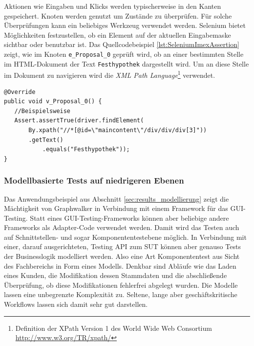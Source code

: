 Aktionen wie Eingaben und Klicks werden typischerweise in den Kanten gespeichert. Knoten werden genutzt um Zustände zu überprüfen. Für solche Überprüfungen kann ein beliebiges Werkzeug verwendet werden. 
Selenium bietet Möglichkeiten festzustellen, ob ein Element auf der aktuellen Eingabemaske sichtbar oder benutzbar ist. Das Quellcodebeispiel \ref{lst:SeleniumImexAssertion} zeigt, wie im Knoten \texttt{e\_Proposal\_0} geprüft wird, ob an einer bestimmten Stelle im HTML-Dokument der Text \texttt{Festhypothek} dargestellt wird. Um an diese Stelle im Dokument zu navigieren wird die \textit{XML Path Language}\footnote{Definition der XPath Version 1 des World Wide Web Consortium \url{http://www.w3.org/TR/xpath/}} verwendet.

\begin{lstlisting}[caption={Eine Assertion in Selenium auf einem Graphwalker Knoten}, label=lst:SeleniumImexAssertion, float]
@Override
public void v_Proposal_0() {
   //Beispielsweise
   Assert.assertTrue(driver.findElement(
	   By.xpath("//*[@id=\"maincontent\"/div/div/div[3]"))
	   .getText()
           .equals("Festhypothek"));
}
\end{lstlisting}

\subsubsection{Modellbasierte Tests auf niedrigeren Ebenen} Das Anwendungsbeispiel aus Abschnitt \ref{sec:results_modellierung} zeigt die Mächtigkeit von Graphwalker in Verbindung mit einem Framework für das GUI-Testing. Statt eines GUI-Testing-Frameworks können aber beliebige andere Frameworks als Adapter-Code verwendet werden. Damit wird das Testen auch auf Schnittstellen- und sogar Komponententestebene möglich. In Verbindung mit einer, darauf ausgerichteten, Testing API zum \Gls{SUT} können aber genauso Tests der Businesslogik modelliert werden. Also eine Art Komponententest aus Sicht des Fachbereichs in Form eines Modells. Denkbar sind Abläufe wie das Laden eines Kunden, die Modifikation dessen Stammdaten und die abschließende Überprüfung, ob diese Modifikationen fehlerfrei abgelegt wurden. Die Modelle lassen eine unbegrenzte Komplexität zu. Seltene, lange aber geschäftskritische Workflows lassen sich damit sehr gut darstellen.

